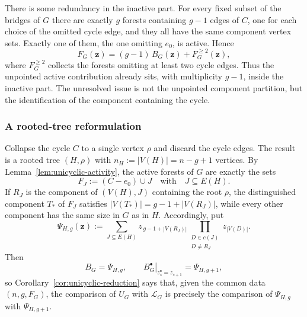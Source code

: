 \documentclass[11pt]{article}
\theoremstyle{plain}
\theoremstyle{definition}
\renewcommand{\mathcal}{\mathscr}
\newcommand{\LL}{\mathcal{L}}    %
\newcommand{\bz}{\mathbf{z}}
\numberwithin{equation}{section}
\begin{document}
There is some redundancy in the inactive part.  For every fixed subset of the
bridges of $G$ there are exactly $g$ forests containing $g-1$ edges of $C$,
one for each choice of the omitted cycle edge, and they all have the same
component vertex sets.  Exactly one of them, the one omitting $e_0$, is
active.  Hence
\begin{equation}\label{eq:unicyclic-inactive-splitting}
   F_G(\bz)=(g-1)\,B_G(\bz)+F^{\ge 2}_G(\bz),
\end{equation}
where $F^{\ge 2}_G$ collects the forests omitting at least two cycle edges.
Thus the unpointed active contribution already sits, with multiplicity $g-1$,
inside the inactive part.  The unresolved issue is not the unpointed component
partition, but the identification of the component containing the cycle.

\subsubsection*{A rooted-tree reformulation}

Collapse the cycle $C$ to a single vertex $\rho$ and discard the cycle edges.
The result is a rooted tree $(H,\rho)$ with $n_H:=|V(H)|=n-g+1 $ vertices.
By Lemma~\ref{lem:unicyclic-activity}, the active forests of $G$ are exactly the sets
\[
F_J:=(C-e_0)\cup J \quad \text{with} \quad J\subseteq E(H).
\]
If $R_J$ is the
component of $(V(H),J)$ containing the root $\rho$, the distinguished component $T_*$ of $F_J$
satisfies $|V(T_*)|=g-1+|V(R_J)|$, while every other component has the same
size in $G$ as in $H$.  Accordingly, put
\begin{equation}\label{eq:root-shift-polynomial}
   \Psi_{H,g}(\bz)
   :=
   \sum_{J\subseteq E(H)}
      z_{\,g-1+|V(R_J)|}
      \prod_{\substack{D\in c(J)\\D\ne R_J}} z_{|V(D)|}.
\end{equation}
Then
\begin{equation}\label{eq:unicyclic-active-rooted}
   B_G=\Psi_{H,g},
   \qquad
   \left.B_G^\bullet\right|_{z^\bullet_s=z_{s+1}}=\Psi_{H,g+1},
\end{equation}
so Corollary~\ref{cor:unicyclic-reduction} says that, given the common data
$(n,g,F_G)$, the comparison of $U_G$ with $\LL_G$ is precisely the comparison
of $\Psi_{H,g}$ with $\Psi_{H,g+1}$.
\end{document}
